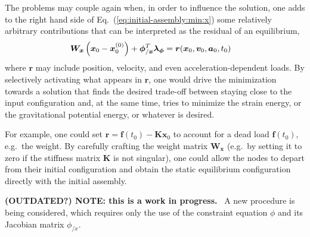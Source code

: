 \documentclass[10pt,fleqn,subeqn]{report}
\newcommand{\T}[1]{\bm{#1}}
\newcommand{\TT}[1]{\bm{#1}}
\begin{document}
The problems may couple again when, in order to influence the solution,
one adds to the right hand side of Eq.~(\ref{eq:initial-assembly:min:x})
some relatively arbitrary contributions that can be interpreted
as the residual of an equilibrium,
\begin{align}
	\TT{W}_{\T{x}} \plbr{\T{x}_0 - \T{x}_0^{(0)}}
	+
	\T{\phi}_{/\T{x}}^T \T{\lambda}_{\T{\phi}}
	&=
	\T{r}(\T{x}_0, \T{v}_0, \T{a}_0, t_0)
\end{align}
where $\T{r}$ may include position, velocity, and even acceleration-dependent loads.
By selectively activating what appears in $\T{r}$, one would drive the minimization
towards a solution that finds the desired trade-off between staying close
to the input configuration and, at the same time, tries to minimize the strain energy,
or the gravitational potential energy, or whatever is desired.

For example, one could set $\T{r} = \T{f}(t_0) - \TT{K} \T{x}_0$
to account for a dead load $\T{f}(t_0)$, e.g.\ the weight.
By carefully crafting the weight matrix $\TT{W}_{\T{x}}$
(e.g.\ by setting it to zero if the stiffness matrix $\TT{K}$ is not singular),
one could allow the nodes to depart from their initial configuration
and obtain the static equilibrium configuration directly with the initial assembly.



\bigskip



\textbf{(OUTDATED?) NOTE: this is a work in progress.} \
A new procedure is being considered, which requires only the use 
of the constraint equation $\phi$ and its Jacobian matrix $\phi_{/x}$.
\end{document}

